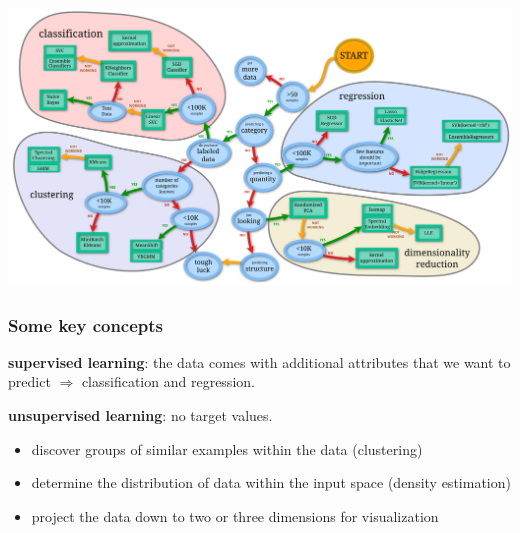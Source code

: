 \begin{frame}
\frametitle{}
\hspace*{-1.2cm}
\includegraphics[width=1.2\textwidth]{sklearn_material/overview.png}
% 
\end{frame}


\begin{frame}
\frametitle{Some key concepts}



\textbf{supervised learning}: the data comes with additional
attributes that we want to predict $\Longrightarrow$
classification and regression.\\
\vspace{1cm}

\textbf{unsupervised learning}: no target values. 
\begin{itemize}
\item
discover groups of similar examples within the data (clustering)
\item
determine the distribution of data within the input space (density estimation)
\item
project the data down to two or three dimensions for visualization
\end{itemize}

\end{frame}



